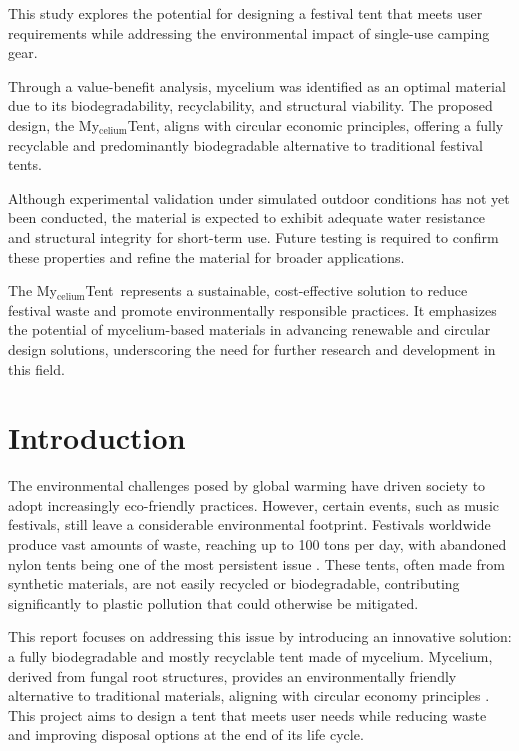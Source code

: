 \documentclass{article}
\newcommand{\myc}{My$_{\text{celium}}$Tent}
\begin{document}
This study explores the potential for designing a festival tent that
meets user requirements while addressing the environmental impact of
single-use camping gear.  

Through a value-benefit analysis, mycelium was identified as an
optimal material due to its biodegradability, recyclability, and
structural viability. The proposed design, the \myc,
aligns with circular economic principles, offering a fully recyclable
and predominantly biodegradable alternative to traditional festival
tents. 

Although experimental validation under simulated outdoor conditions
has not yet been conducted, the material is expected to exhibit
adequate water resistance and structural integrity for short-term use.
Future testing is required to confirm these properties and refine the
material for broader applications. 

The \myc\ represents a sustainable, cost-effective solution to
reduce festival waste and promote environmentally responsible
practices. It emphasizes the potential of mycelium-based materials in
advancing renewable and circular design solutions, underscoring the
need for further research and development in this field.

\newpage
\tableofcontents
\thispagestyle{empty}

\newpage
\section{Introduction}
The environmental challenges posed by global warming have driven society to adopt
increasingly eco-friendly practices. However, certain events, such as music festivals,
still leave a considerable environmental footprint. Festivals worldwide produce vast
amounts of waste, reaching up to 100 tons per day, with abandoned nylon tents being one
of the most persistent issue \parencite{Gray2019}. These tents, often made
from synthetic materials, are not easily recycled or biodegradable, contributing
significantly to plastic pollution that could otherwise be mitigated.

This report focuses on addressing this issue by introducing an innovative solution: a
fully biodegradable and mostly recyclable tent made of mycelium. Mycelium, derived from
fungal root structures, provides an environmentally friendly alternative to traditional
materials, aligning with circular economy principles \parencite{attias}. This project
aims to design a tent that meets user needs while reducing waste and improving disposal
options at the end of its life cycle.
\end{document}

